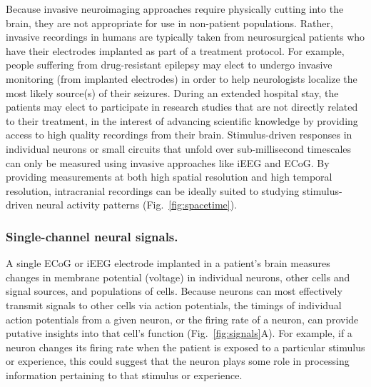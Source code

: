 \documentclass[runningheads]{llncs}
\begin{document}
Because invasive neuroimaging approaches require physically cutting
into the brain, they are not appropriate for use in non-patient
populations.  Rather, invasive recordings in humans are typically
taken from neurosurgical patients who have their electrodes implanted
as part of a treatment protocol.  For example, people suffering from
drug-resistant epilepsy may elect to undergo invasive monitoring (from
implanted electrodes) in order to help neurologists localize the most
likely source(s) of their seizures.  During an extended hospital stay,
the patients may elect to participate in research studies that are not
directly related to their treatment, in the interest of advancing
scientific knowledge by providing access to high quality recordings
from their brain.  Stimulus-driven responses in individual neurons or
small circuits that unfold over sub-millisecond timescales can only
be measured using invasive approaches like iEEG and ECoG.  By
providing measurements at both high spatial resolution and high
temporal resolution, intracranial recordings can be ideally suited to
studying stimulus-driven neural activity patterns
(Fig.~\ref{fig:spacetime}).


\subsubsection{Single-channel neural signals.}
A single ECoG or iEEG electrode implanted in a patient's brain
measures changes in membrane potential (voltage) in individual
neurons, other cells and signal sources, and populations of cells.
Because neurons can most effectively transmit signals to other cells
via action potentials, the timings of individual action potentials from a
given neuron, or the firing rate of a neuron, can provide putative
insights into that cell's function (Fig.~\ref{fig:signals}A).  For
example, if a neuron changes its firing rate when the patient is
exposed to a particular stimulus or experience, this could suggest
that the neuron plays some role in processing information pertaining
to that stimulus or experience.
\end{document}
